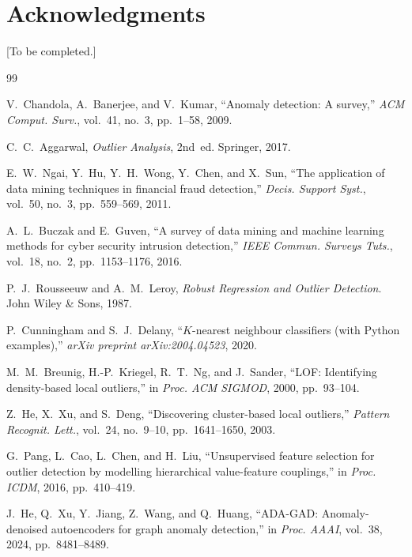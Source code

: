 \documentclass[lettersize,journal]{IEEEtran}
\begin{document}
\section*{Acknowledgments}
[To be completed.]

\begin{thebibliography}{99}


V.~Chandola, A.~Banerjee, and V.~Kumar, ``Anomaly detection: A survey,''
\textit{ACM Comput. Surv.}, vol.~41, no.~3, pp.~1--58, 2009.

C.~C.~Aggarwal, \textit{Outlier Analysis}, 2nd~ed. Springer, 2017.

E.~W.~Ngai, Y.~Hu, Y.~H.~Wong, Y.~Chen, and X.~Sun, ``The application of data mining
techniques in financial fraud detection,'' \textit{Decis. Support Syst.}, vol.~50, no.~3,
pp.~559--569, 2011.

A.~L.~Buczak and E.~Guven, ``A survey of data mining and machine learning methods for
cyber security intrusion detection,'' \textit{IEEE Commun. Surveys Tuts.}, vol.~18, no.~2,
pp.~1153--1176, 2016.

P.~J.~Rousseeuw and A.~M.~Leroy, \textit{Robust Regression and Outlier Detection}.
John Wiley \& Sons, 1987.

P.~Cunningham and S.~J.~Delany, ``$K$-nearest neighbour classifiers (with Python examples),''
\textit{arXiv preprint arXiv:2004.04523}, 2020.

M.~M.~Breunig, H.-P.~Kriegel, R.~T.~Ng, and J.~Sander, ``LOF: Identifying density-based
local outliers,'' in \textit{Proc. ACM SIGMOD}, 2000, pp.~93--104.

Z.~He, X.~Xu, and S.~Deng, ``Discovering cluster-based local outliers,''
\textit{Pattern Recognit. Lett.}, vol.~24, no.~9--10, pp.~1641--1650, 2003.

G.~Pang, L.~Cao, L.~Chen, and H.~Liu, ``Unsupervised feature selection for outlier detection
by modelling hierarchical value-feature couplings,'' in \textit{Proc. ICDM}, 2016, pp.~410--419.

J.~He, Q.~Xu, Y.~Jiang, Z.~Wang, and Q.~Huang, ``ADA-GAD: Anomaly-denoised autoencoders
for graph anomaly detection,'' in \textit{Proc. AAAI}, vol.~38, 2024, pp.~8481--8489.


\end{thebibliography}
\end{document}
